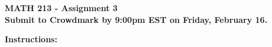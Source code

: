 \documentclass[11pt,a4paper]{article}
\begin{document}
	
	\begin{center}
		\LARGE \textbf{MATH 213 - Assignment 3}\\ \vspace{0.3cm}
		\normalsize \textbf{Submit to Crowdmark by 9:00pm EST on Friday, February 16.}\\ \vspace{0.3cm}
	\end{center}
	
	
	
	
	
	\theoremstyle{plain}
	\newtheorem{thm}{Theorem}
	\newtheorem{lem}[thm]{Lemma}
	\newtheorem{cor}[thm]{Corollary}
	\newtheorem{prop}[thm]{Proposition}
	\newtheorem{defn}[thm]{Definition}
	\newtheorem{exmp}[thm]{Example}
	\newtheorem{rmk}[thm]{Remark}
	\newtheorem{exer}[thm]{Exercise}
	
	
	\newcommand{\cc}{\mathbb{C}}
	\newcommand{\rr}{\mathbb{R}}
	\newcommand{\dd}{\mathbb{D}}
	\newcommand{\cldd}{\overline{\mathbb{D}}}
	\newcommand{\epsi}{\varepsilon}
	\newcommand{\nn}{\mathbb{N}}
	\newcommand{\zz}{\mathbb{Z}}
	\newcommand{\I}{\mathcal{I}}
	\newcommand{\fy}{\varphi}
	\newcommand{\sign}{\text{sign}}
	\newcommand{\bfs}{\textbf{S}}
	\newcommand{\triv}{\textbf{1}}
	\newcommand{\bb}{\textbf{B}}
	\newcommand{\alga}{\mathcal{A}}
	\newcommand{\hilb}{\mathcal{H}}
	\newcommand{\inv}{\mathrm{GL}}
	\newcommand{\nil}{\mathrm{Nil}}
	\newcommand{\qnil}{\mathrm{QNil}}
	\newcommand{\bh}{\mathcal{B(H)}}
	\newcommand{\qh}{\mathcal{Q(H)}}
	\newcommand{\ol}{\overline}
	\newcommand{\dist}{\mathrm{dist}}
	\newcommand{\nor}{\mathrm{Nor}}
	\newcommand{\mm}{\mathbb{M}}
	\newcommand{\au}{\sim_{au}}
	\newcommand{\sorb}{\mathcal{S}}
	\newcommand{\alg}{\mathrm{Alg}}
	\newcommand{\bqt}{\mathrm{BQT}}
	\newcommand\scalemath[2]{\scalebox{#1}{\mbox{\ensuremath{\displaystyle #2}}}}
	
	

	
	
	\vfill 
	\normalsize \noindent \textbf{Instructions:}
	
\end{document}
